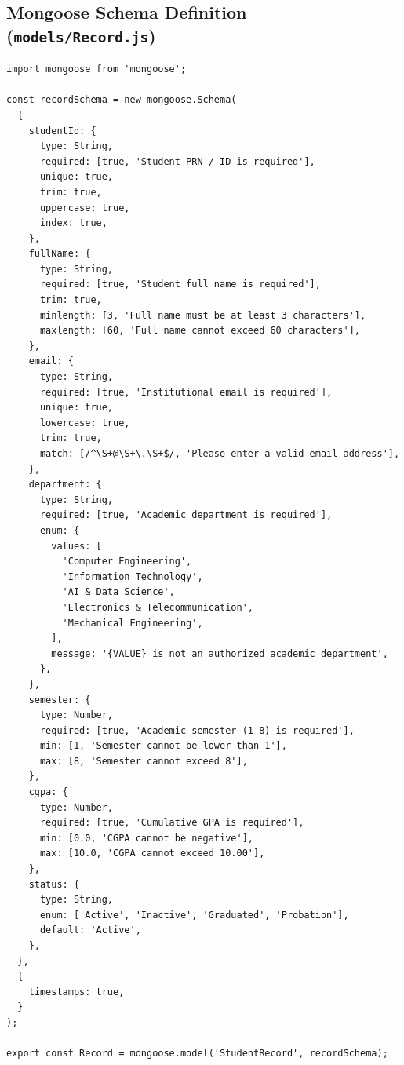 \documentclass[11pt,a4paper]{article}
\begin{document}
\newpage
\subsection{Mongoose Schema Definition (\texttt{models/Record.js})}
\begin{lstlisting}[caption={Mongoose Data Schema with Validation Constraints and Indexes (\texttt{models/Record.js})}]
import mongoose from 'mongoose';

const recordSchema = new mongoose.Schema(
  {
    studentId: {
      type: String,
      required: [true, 'Student PRN / ID is required'],
      unique: true,
      trim: true,
      uppercase: true,
      index: true,
    },
    fullName: {
      type: String,
      required: [true, 'Student full name is required'],
      trim: true,
      minlength: [3, 'Full name must be at least 3 characters'],
      maxlength: [60, 'Full name cannot exceed 60 characters'],
    },
    email: {
      type: String,
      required: [true, 'Institutional email is required'],
      unique: true,
      lowercase: true,
      trim: true,
      match: [/^\S+@\S+\.\S+$/, 'Please enter a valid email address'],
    },
    department: {
      type: String,
      required: [true, 'Academic department is required'],
      enum: {
        values: [
          'Computer Engineering',
          'Information Technology',
          'AI & Data Science',
          'Electronics & Telecommunication',
          'Mechanical Engineering',
        ],
        message: '{VALUE} is not an authorized academic department',
      },
    },
    semester: {
      type: Number,
      required: [true, 'Academic semester (1-8) is required'],
      min: [1, 'Semester cannot be lower than 1'],
      max: [8, 'Semester cannot exceed 8'],
    },
    cgpa: {
      type: Number,
      required: [true, 'Cumulative GPA is required'],
      min: [0.0, 'CGPA cannot be negative'],
      max: [10.0, 'CGPA cannot exceed 10.00'],
    },
    status: {
      type: String,
      enum: ['Active', 'Inactive', 'Graduated', 'Probation'],
      default: 'Active',
    },
  },
  {
    timestamps: true,
  }
);

export const Record = mongoose.model('StudentRecord', recordSchema);
\end{lstlisting}

\newpage
\end{document}
